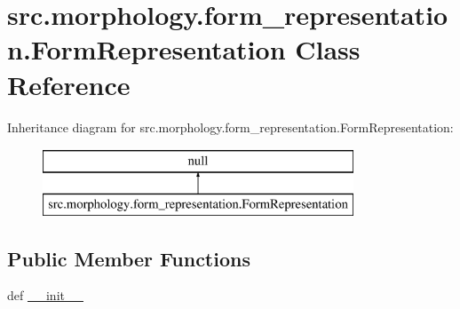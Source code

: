 \hypertarget{classsrc_1_1morphology_1_1form__representation_1_1_form_representation}{\section{src.\+morphology.\+form\+\_\+representation.\+Form\+Representation Class Reference}
\label{classsrc_1_1morphology_1_1form__representation_1_1_form_representation}
}
Inheritance diagram for src.\+morphology.\+form\+\_\+representation.\+Form\+Representation\+:\begin{figure}[H]
\begin{center}
\leavevmode
\includegraphics[height=2.000000cm]{classsrc_1_1morphology_1_1form__representation_1_1_form_representation}
\end{center}
\end{figure}
\subsection*{Public Member Functions}
\begin{DoxyCompactItemize}
\item 
def \hyperlink{classsrc_1_1morphology_1_1form__representation_1_1_form_representation_a2f13f4960c4a545b1479ae57c292731f}{\+\_\+\+\_\+init\+\_\+\+\_\+}
\end{DoxyCompactItemize}
